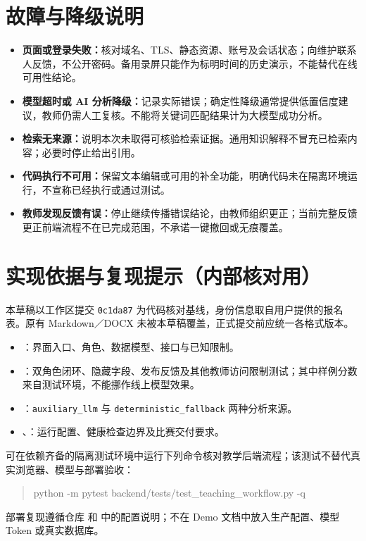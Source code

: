 \documentclass[UTF8,a4paper,zihao=-4,fontset=fandol]{ctexart}
\begin{document}
\section{故障与降级说明}
\begin{itemize}
  \item \textbf{页面或登录失败：}核对域名、TLS、静态资源、账号及会话状态；向维护联系人反馈，不公开密码。备用录屏只能作为标明时间的历史演示，不能替代在线可用性结论。
  \item \textbf{模型超时或 AI 分析降级：}记录实际错误；确定性降级通常提供低置信度建议，教师仍需人工复核。不能将关键词匹配结果计为大模型成功分析。
  \item \textbf{检索无来源：}说明本次未取得可核验检索证据。通用知识解释不冒充已检索内容；必要时停止给出引用。
  \item \textbf{代码执行不可用：}保留文本编辑或可用的补全功能，明确代码未在隔离环境运行，不宣称已经执行或通过测试。
  \item \textbf{教师发现反馈有误：}停止继续传播错误结论，由教师组织更正；当前完整反馈更正前端流程不在已完成范围，不承诺一键撤回或无痕覆盖。
\end{itemize}

\appendix
\section{实现依据与复现提示（内部核对用）}
本草稿以工作区提交 \texttt{0c1da87} 为代码核对基线，身份信息取自用户提供的报名表。原有 Markdown／DOCX 未被本草稿覆盖，正式提交前应统一各格式版本。
\begin{itemize}
  \item {}：界面入口、角色、数据模型、接口与已知限制。
  \item {}：双角色闭环、隐藏字段、发布反馈及其他教师访问限制测试；其中样例分数来自测试环境，不能挪作线上模型效果。
  \item {}：\texttt{auxiliary\_llm} 与 \texttt{deterministic\_fallback} 两种分析来源。
  \item {}、：运行配置、健康检查边界及比赛交付要求。
\end{itemize}
可在依赖齐备的隔离测试环境中运行下列命令核对教学后端流程；该测试不替代真实浏览器、模型与部署验收：
\begin{quote}\small\ttfamily
python -m pytest backend/tests/test\_teaching\_workflow.py -q
\end{quote}
部署复现遵循仓库  和  中的配置说明；不在 Demo 文档中放入生产配置、模型 Token 或真实数据库。
\end{document}
